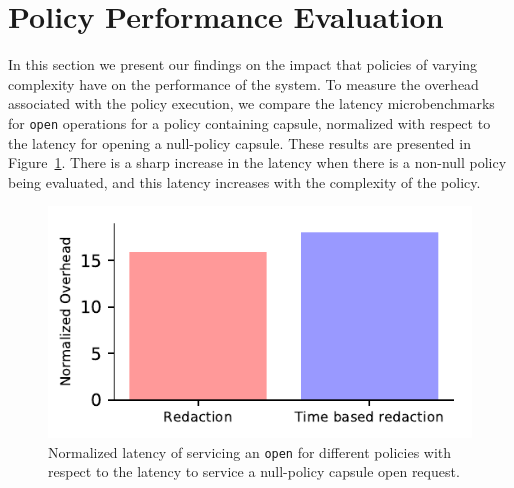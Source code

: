 \section{Policy Performance Evaluation}


In this section we present our findings on the impact that
policies of varying complexity have on the performance of the
system. %
To measure the overhead associated with the policy execution, we
compare the latency microbenchmarks for \texttt{open} operations for a
policy containing capsule, normalized with respect to the latency for
opening a null-policy capsule. These results are presented in
Figure~\ref{fig:policy_latency}. There is a sharp increase in the
latency when there is a non-null policy being evaluated, and this
latency increases with the complexity of the policy.
\begin{figure}[ht!]
    \centering
    \includegraphics{fig/policy_latencies.pdf}
    \caption{Normalized latency of servicing an \texttt{open} for different policies with respect to the latency to service a null-policy capsule open request. }
    \label{fig:policy_latency}
\end{figure}
\\\\


